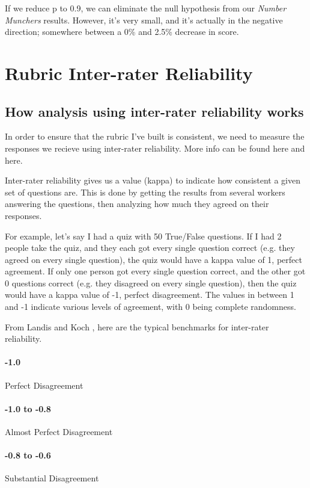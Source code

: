 				If we reduce p to 0.9, we can eliminate the null hypothesis from our \textit{Number Munchers} results. However, it's very small, and it's actually in the negative direction; somewhere between a 0\% and 2.5\% decrease in score.

		\section{Rubric Inter-rater Reliability}
			\subsection{How analysis using inter-rater reliability works}

				In order to ensure that the rubric I've built is consistent, we need to measure the responses we recieve using inter-rater reliability. More info can be found here and here.

				Inter-rater reliability gives us a value (kappa) to indicate how consistent a given set of questions are. This is done by getting the results from several workers answering the questions, then analyzing how much they agreed on their responses.

				For example, let's say I had a quiz with 50 True/False questions. If I had 2 people take the quiz, and they each got every single question correct (e.g. they agreed on every single question), the quiz would have a kappa value of 1, perfect agreement. If only one person got every single question correct, and the other got 0 questions correct (e.g. they disagreed on every single question), then the quiz would have a kappa value of -1, perfect disagreement. The values in between 1 and -1 indicate various levels of agreement, with 0 being complete randomness.

				From Landis and Koch \cite{benchmarks}, here are the typical benchmarks for inter-rater reliability.

				\paragraph{-1.0} Perfect Disagreement

				\paragraph{-1.0 to -0.8} Almost Perfect Disagreement

				\paragraph{-0.8 to -0.6} Substantial Disagreement

